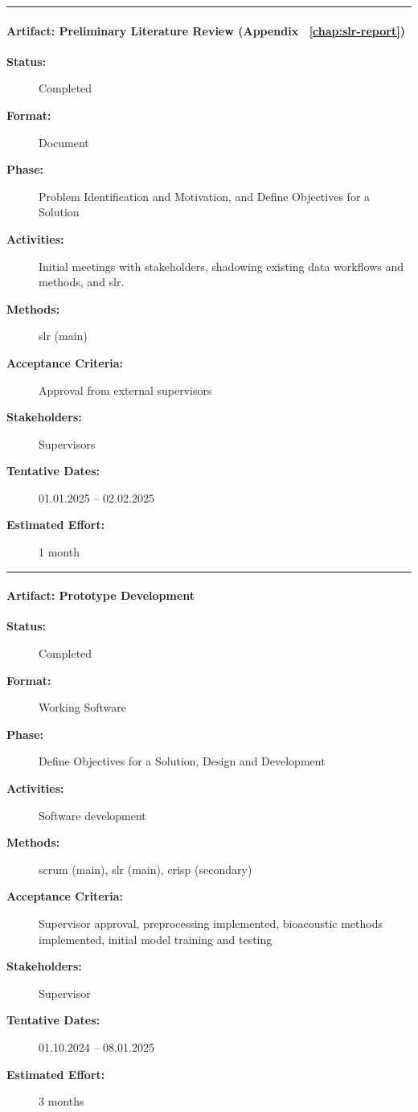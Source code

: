 \noindent\rule{13cm}{0.3pt}

\paragraph{Artifact: Preliminary Literature Review (Appendix ~\ref{chap:slr-report})}
\begin{description}
  \item[\textbf{Status:}] Completed
    \item[\textbf{Format:}] Document
  \item[\textbf{Phase:}] Problem Identification and Motivation, and Define Objectives for a Solution
  \item[\textbf{Activities:}] Initial meetings with stakeholders, shadowing existing data workflows and methods, and \acrshort{slr}.
  \item[\textbf{Methods:}] \acrshort{slr} (main)
  \item[\textbf{Acceptance Criteria:}] Approval from external supervisors
  \item[\textbf{Stakeholders:}] Supervisors
  \item[\textbf{Tentative Dates:}] 01.01.2025 – 02.02.2025
  \item[\textbf{Estimated Effort:}] 1 month
\end{description}

\noindent\rule{13cm}{0.3pt}

\paragraph{Artifact: Prototype Development}
\begin{description}
  \item[\textbf{Status:}] Completed
  \item[\textbf{Format:}] Working Software
  \item[\textbf{Phase:}] Define Objectives for a Solution, Design and Development
  \item[\textbf{Activities:}] Software development
  \item[\textbf{Methods:}] \acrshort{scrum} (main), \acrshort{slr} (main), \acrshort{crisp} (secondary)
  \item[\textbf{Acceptance Criteria:}] Supervisor approval, preprocessing implemented, bioacoustic methods implemented, initial model training and testing
  \item[\textbf{Stakeholders:}] Supervisor
  \item[\textbf{Tentative Dates:}] 01.10.2024 – 08.01.2025
  \item[\textbf{Estimated Effort:}] 3 months
\end{description}

